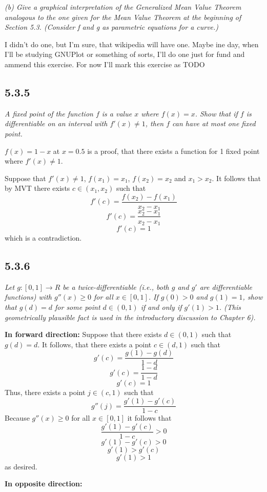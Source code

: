 \documentclass[11pt,oneside,titlepage]{book}
\begin{document}
\textit{(b) Give a graphical interpretation of the Generalized Mean
  Value Theorem analogous to the one given for the Mean Value Theorem at
  the beginning of Section 5.3. (Consider f and g as parametric equations
  for a curve.)}

I didn't do one, but I'm sure, that wikipedia will have one. Maybe ine day,
when I'll be studying GNUPlot or something of sorts, I'll do one just for
fund and ammend this exercise. For now I'll mark this exercise as TODO

\subsection*{5.3.5}
\textit{ A fixed point of the function $f$ is a value $x$ where $f(x) = x$.
  Show that if $f$ is differentiable on an interval with $f'(x) \neq 1$, then
  $f$ can have at most one fixed point.}

$f(x) = 1 - x$ at $x = 0.5$ is a proof, that there exists a function for
1 fixed point where $f'(x) \neq 1$.

Suppose that $f'(x) \neq 1$, $f(x_1) = x_1$, $f(x_2) = x_2$ and $x_1 > x_2$.
It follows that by MVT there exists $c \in (x_1, x_2)$ such that
$$f'(c) = \frac{f(x_2) - f(x_1)}{x_2 - x_1}$$
$$f'(c) = \frac{x_2 - x_1}{x_2 - x_1}$$
$$f'(c) = 1$$
which is a contradiction.

\subsection*{5.3.6}
\textit{Let $g: [0, 1] \to R$ be a twice-differentiable (i.e., both $g$ and
  $g'$ are differentiable functions) with $g''(x) \geq 0$ for all
  $x \in [0, 1]$. If $g(0) > 0$ and $g(1) = 1$, show that $g(d) = d$ for some
  point $d \in (0, 1)$ if and only if $g'(1) > 1$. (This geometrically
  plausible fact is used in the introductory discussion to Chapter 6).}

\textbf{In forward direction: }
Suppose that there exists $d \in (0, 1)$ such that $g(d) = d$. It follows, that
there exists a point $c \in (d, 1)$ such that
$$g'(c) = \frac{g(1) - g(d)}{1 - d}$$
$$g'(c) = \frac{1 - d}{1 - d}$$
$$g'(c) = 1$$
Thus, there exists a point  $j \in (c, 1)$ such that
$$g''(j) = \frac{g'(1) - g'(c)}{1 - c}$$
Because $g''(x) \geq 0$ for all $x \in [0, 1]$ it follows that
$$\frac{g'(1) - g'(c)}{1 - c} > 0$$
$$g'(1) - g'(c) > 0$$
$$g'(1) > g'(c)$$
$$g'(1) > 1$$
as desired.

\textbf{In opposite direction: }
\end{document}
